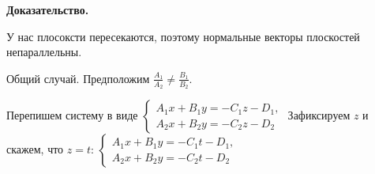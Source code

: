 \documentclass[a4paper]{article}
\begin{document}
    \begin{hproof}
        \textbf{Доказательство.}

        У нас плосоксти пересекаются, поэтому нормальные векторы плоскостей непараллельны.

        Общий случай. Предположим $\displaystyle \frac{A_1}{A_2} \neq \frac{B_1}{B_2}$.

        Перепишем систему в виде $\begin{cases}
                                      A_1x+B_1y=-C_1z-D_1,
                                      \\
                                      A_2x+B_2y=-C_2z-D_2
        \end{cases}
        $ Зафиксируем $z$ и скажем, что $z=t$: $\displaystyle \begin{cases}
                                                                  A_1x+B_1y=-C_1t-D_1,
                                                                  \\
                                                                  A_2x+B_2y=-C_2t-D_2
        \end{cases}
        $


\end{hproof}
\end{document}
